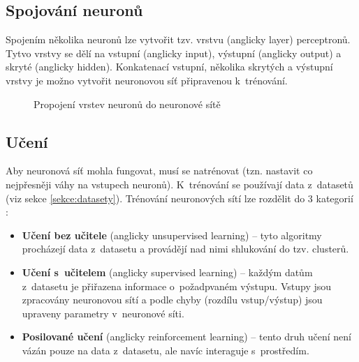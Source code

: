 \subsection*{Spojování neuronů}
Spojením několika neuronů lze vytvořit tzv. vrstvu (anglicky layer) perceptronů. Tytvo vrstvy se dělí na vstupní (anglicky input), výstupní (anglicky output) a skryté (anglicky hidden). Konkatenací vstupní, několika skrytých a výstupní vrstvy je možno vytvořit neuronovou síť připravenou k~trénování.

\begin{figure}[H]
  \begin{center}
  \label{obrazek:nsexample}
  \caption{Propojení vrstev neuronů do neuronové sítě}
  \end{center}
\end{figure}

\subsection*{Učení}
Aby neuronová síť mohla fungovat, musí se natrénovat (tzn. nastavit co nejpřesněji váhy na vstupech neuronů). K~trénování se používají data z~datasetů (viz sekce \ref{sekce:datasety}). Trénování neuronových sítí lze rozdělit do 3 kategorií \cite{deeplearningbook}:

\begin{itemize}
  \item \textbf{Učení bez učitele} (anglicky unsupervised learning) -- tyto algoritmy procházejí data z~datasetu a provádějí nad nimi shlukování do tzv. clusterů.
  \item \textbf{Učení s~učitelem} (anglicky supervised learning) -- každým datům z~datasetu je přiřazena informace o~požadpvaném výstupu. Vstupy jsou zpracovány neuronovou sítí a podle chyby (rozdílu vstup/výstup) jsou upraveny parametry v~neuronové síti.
  \item \textbf{Posilované učení} (anglicky reinforcement learning) -- tento druh učení není vázán pouze na data z~datasetu, ale navíc interaguje s~prostředím.
\end{itemize}

